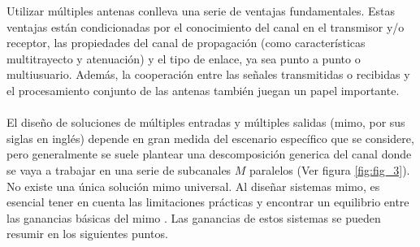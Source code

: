 Utilizar múltiples antenas conlleva una serie de ventajas fundamentales. Estas ventajas están condicionadas por el conocimiento del canal en el transmisor y/o receptor, las propiedades del canal de propagación (como características multitrayecto y atenuación) y el tipo de enlace, ya sea punto a punto o multiusuario. Además, la cooperación entre las señales transmitidas o recibidas y el procesamiento conjunto de las antenas también juegan un papel importante.\\
\\
El diseño de soluciones de múltiples entradas y múltiples salidas (\gls{mimo}, por sus siglas en inglés) depende en gran medida del escenario específico que se considere, pero generalmente se suele plantear una descomposición generica del canal donde se vaya a trabajar en una serie de subcanales $M$ paralelos (Ver figura \ref{fig:fig_3}). No existe una única solución \gls{mimo} universal. Al diseñar sistemas \gls{mimo}, es esencial tener en cuenta las limitaciones prácticas y encontrar un equilibrio entre las ganancias básicas del \gls{mimo} \cite{ordonez2011fundamental}. Las ganancias de estos sistemas se pueden resumir en los siguientes puntos.


